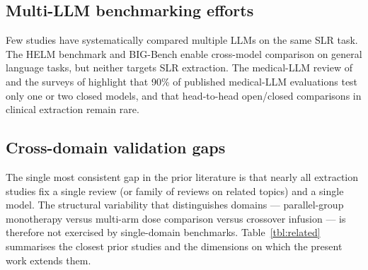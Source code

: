\documentclass[a4paper,fleqn]{cas-sc}
\begin{document}
\subsection{Multi-LLM benchmarking efforts}

Few studies have systematically compared multiple LLMs on the same SLR
task. The HELM benchmark \citep{liang2023helm} and BIG-Bench
\citep{srivastava2023bigbench} enable cross-model comparison on general
language tasks, but neither targets SLR extraction. The medical-LLM
review of \citet{lee2024evaluation} and the surveys of
\citet{pressman2024clinicalllm,maity2025healthcare} highlight that 90\% of
published medical-LLM evaluations test only one or two closed models,
and that head-to-head open/closed comparisons in clinical extraction
remain rare.

\subsection{Cross-domain validation gaps}

The single most consistent gap in the prior literature is that nearly all
extraction studies fix a single review (or family of reviews on related
topics) and a single model. The structural variability that distinguishes
domains --- parallel-group monotherapy versus multi-arm dose comparison
versus crossover infusion --- is therefore not exercised by single-domain
benchmarks. Table~\ref{tbl:related} summarises the closest prior studies
and the dimensions on which the present work extends them.
\end{document}
